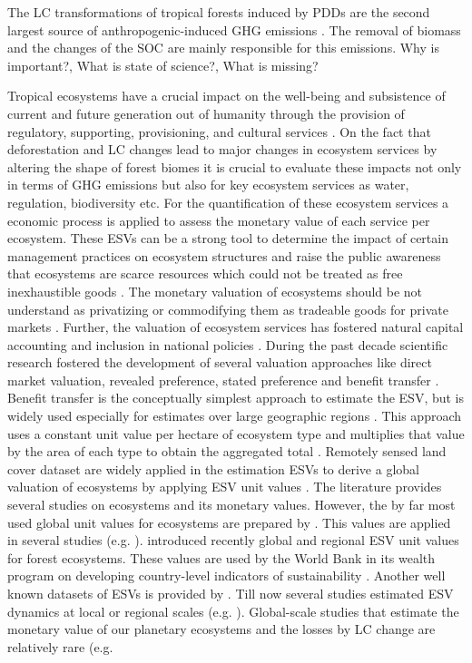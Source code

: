	The \ac{LC} transformations of tropical forests induced by \acp{PDD} are the second largest source of anthropogenic-induced \ac{GHG} emissions \citep{Don2010}. The removal of biomass and the changes of the \ac{SOC} are mainly responsible for this emissions. Why is important?, What is state of science?, What is missing?

	Tropical ecosystems have a crucial impact on the well-being and subsistence of current and future generation out of humanity through the provision of regulatory, supporting, provisioning, and cultural services \citep{Costanza1997}. On the fact that deforestation and \ac{LC} changes lead to major changes in ecosystem services by altering the shape of forest biomes it is crucial to evaluate these impacts not only in terms of \ac{GHG} emissions but also for key ecosystem services as water, regulation, biodiversity etc. For the quantification of these ecosystem services a economic process is applied to assess the monetary value of each service per ecosystem. These \acp{ESV} can be a strong tool to determine the impact of certain management practices on ecosystem structures and raise the public awareness that ecosystems are scarce resources which could not be treated as free inexhaustible goods \citep{Groot2012}. The monetary valuation of ecosystems should be not understand as privatizing or commodifying them as tradeable goods for private markets \citep{Costanza2014,Song2018}. Further, the valuation of ecosystem services has fostered natural capital accounting and inclusion in national policies \citep{Song2018}. During the past decade scientific research fostered the development of several valuation approaches like direct market valuation, revealed preference, stated preference and benefit transfer \citep{Song2018}. Benefit transfer is the conceptually simplest approach to estimate the \ac{ESV}, but is widely used especially for estimates over large geographic regions \citep{Costanza1997,Song2018,Costanza2014}. This approach uses a constant unit value per hectare of ecosystem type and multiplies that value by the area of each type to obtain the aggregated total \citep{Costanza2014}. Remotely sensed land cover dataset are widely applied in the estimation \acp{ESV} to derive a global valuation of ecosystems by applying \ac{ESV} unit values \citep{Song2018}. The literature provides several studies on ecosystems and its monetary values. However, the by far most used global unit values for ecosystems are prepared by \citeauthor{Costanza2014}. This values are applied in several studies (e.g. \citet{Costanza2014,Song2018,Sannigrahi2018,Kreuter2001,Wang2006,Zhao2004}). \citet{Siikamaki2015} introduced recently global and regional \ac{ESV} unit values for forest ecosystems. These values are used by the World Bank in its wealth program on developing country-level indicators of sustainability \citep{Siikamaki2015}. Another well known datasets of \acp{ESV} is provided by \citet{Groot2012}. Till now several studies estimated \ac{ESV} dynamics at local or regional scales (e.g. \citet{Kreuter2001,Wang2006,Zhao2004}). Global-scale studies that estimate the monetary value of our planetary ecosystems and the losses by \ac{LC} change are relatively rare (e.g. 